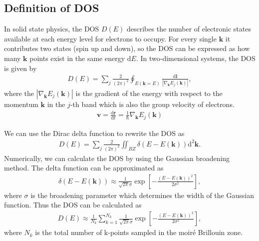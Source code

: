 \documentclass[10pt, oneside]{article}
\newcommand{\mr}[1]{\mathrm{#1}}
\newcommand{\p}[1]{\left(#1\right)}
\newcommand{\bb}[1]{\left[#1\right]}
\newcommand{\bv}[1]{\left|#1\right|}
\begin{document}
\subsection{Definition of DOS}
In solid state physics, the DOS \(D\p{E}\) describes the number of electronic states available at each energy level for electrons to occupy. For every single \(\bm{k}\) it contributes two states (spin up and down), so the DOS can be expressed as how many \(\bm{k}\) points exist in the same energy \(\mr{d} E\). In two-dimensional systems, the DOS is given by
\begin{align}
	D\p{E} = \sum_{j} \frac{2}{\p{2 \pi}^{2}} \oint_{E\p{\bm{k} = E}} \frac{\mr{d} \bm{l}}{ \bv{\nabla_{\bm{k}} E_{j} \p{\bm{k}}}},
\end{align}
where the \(\bv{\nabla_{\bm{k}} E_{j} \p{\bm{k}}}\) is the gradient of the energy with respect to the momentum \(\bm{k}\) in the \(j\)-th band which is also the group velocity of electrons.
\begin{align}
	\bm{v} = \frac{\mr{d} \bm{r}}{\mr{d} t} = \frac{1}{\hbar} \nabla_{\bm{k}} E_{j} \p{\bm{k}}
\end{align}

We can use the Dirac delta function to rewrite the DOS as
\begin{align}
	D\p{E} =  \sum_{j} \frac{2}{\p{2 \pi}^{2}} \iint_{BZ} \delta \p{E - E\p{\bm{k}}} \mr{d}^{2} \bm{k}.
\end{align} 
Numerically, we can calculate the DOS by using the Gaussian broadening method. The delta function can be approximated as
\begin{align}
	\delta \p{E - E\p{\bm{k}}} \approx \frac{1}{\sqrt{2 \pi} \sigma} \exp{ \bb{-\frac{\p{E - E\p{\bm{k}}}^{2}}{2 \sigma^{2}}}},
\end{align}
where \(\sigma\) is the broadening parameter which determines the width of the Gaussian function. Thus the DOS can be calculated as
\begin{align}
	D\p{E} \approx \frac{1}{N_k} \sum_{k = 1}^{N_k}\frac{1}{\sqrt{2 \pi} \sigma} \exp{ \bb{-\frac{\p{E - E\p{\bm{k}}}^{2}}{2 \sigma^{2}}}},
\end{align}
where \(N_k\) is the total number of k-points sampled in the moiré Brillouin zone.
\end{document}
